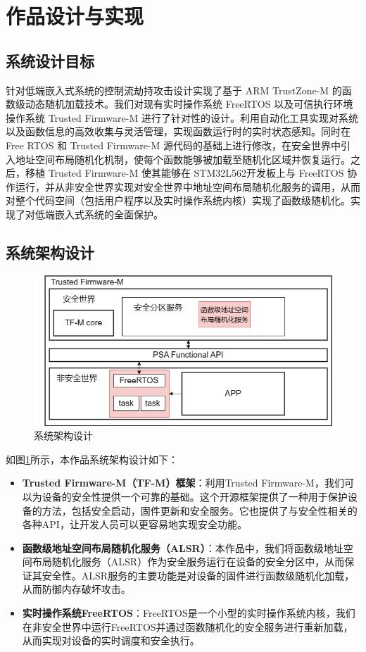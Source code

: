 \documentclass[12pt,a4paper]{ctexart}
\numberwithin{figure}{section}
\begin{document}
\section{作品设计与实现}
\subsection{系统设计目标}
\par 针对低端嵌入式系统的控制流劫持攻击设计实现了基于 ARM TrustZone-M 的函数级动态随机加载技术。我们对现有实时操作系统 FreeRTOS 以及可信执行环境操作系统 Trusted Firmware-M 进行了针对性的设计。利用自动化工具实现对系统以及函数信息的高效收集与灵活管理，实现函数运行时的实时状态感知。同时在 Free RTOS 和 Trusted Firmware-M 源代码的基础上进行修改，在安全世界中引入地址空间布局随机化机制，使每个函数能够被加载至随机化区域并恢复运行。之后，移植 Trusted Firmware-M 使其能够在 STM32L562开发板上与 FreeRTOS 协作运行，并从非安全世界实现对安全世界中地址空间布局随机化服务的调用，从而对整个代码空间（包括用户程序以及实时操作系统内核）实现了函数级随机化。实现了对低端嵌入式系统的全面保护。
\subsection{系统架构设计}
\begin{figure}[H]
    \centering
    \includegraphics[scale=0.5]{graph/picture of all works.png}
    \caption{系统架构设计}
    \label{fig:system_architecture}
\end{figure}
\par 如图\ref{fig:system_architecture}所示，本作品系统架构设计如下：

\begin{itemize}
    \item \textbf{Trusted Firmware-M（TF-M）框架}：利用Trusted Firmware-M，我们可以为设备的安全性提供一个可靠的基础。这个开源框架提供了一种用于保护设备的方法，包括安全启动，固件更新和安全服务。它也提供了与安全性相关的各种API，让开发人员可以更容易地实现安全功能。
    \item \textbf{函数级地址空间布局随机化服务（ALSR）}：本作品中，我们将函数级地址空间布局随机化服务（ALSR）作为安全服务运行在设备的安全分区中，从而保证其安全性。ALSR服务的主要功能是对设备的固件进行函数级随机化加载，从而防御内存破坏攻击。
    \item \textbf{实时操作系统FreeRTOS}：FreeRTOS是一个小型的实时操作系统内核，我们在非安全世界中运行FreeRTOS并通过函数随机化的安全服务进行重新加载，从而实现对设备的实时调度和安全执行。
\end{itemize}
\end{document}
